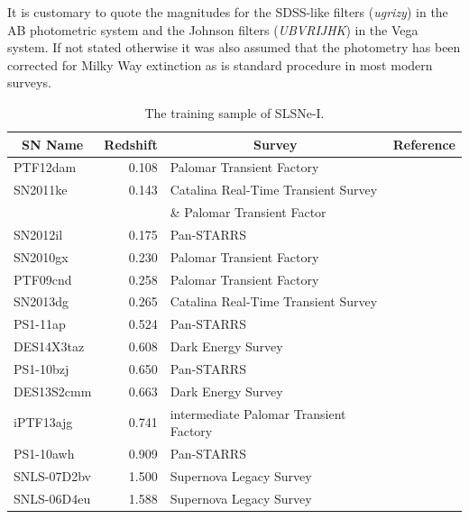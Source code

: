 It is customary to quote the magnitudes for the SDSS-like filters (\textit{ugrizy}) in the AB photometric system and the Johnson filters (\textit{UBVRIJHK}) in the Vega system. If not stated otherwise it was also assumed that the photometry has been corrected for Milky Way extinction as is standard procedure in most modern surveys.

\begin{table}
\begin{center}
  \caption{The training sample of SLSNe-I.}
\label{tab:PubishedSLSNe}
\begin{tabular}{|l|r|l|l|}
\hline
  \multicolumn{1}{|c|}{SN Name} &
  \multicolumn{1}{c|}{Redshift} &
  \multicolumn{1}{c|}{Survey} &
  \multicolumn{1}{c|}{Reference} \\
\hline
  PTF12dam         & 0.108 & Palomar Transient Factory             & \citet{Nicholl2013}\\
  SN2011ke         & 0.143 & Catalina Real-Time Transient Survey     & \citet{Inserra2013}\\
                      &       & \& Palomar Transient Factor & \\
  SN2012il         & 0.175 & Pan-STARRS                             & \citet{Lunnan2013}\\
  SN2010gx         & 0.230 & Palomar Transient Factory             & \citet{Pastorello2010}\\
  PTF09cnd         & 0.258 & Palomar Transient Factory             & \citet{Quimby2011}\\
  SN2013dg         & 0.265 & Catalina Real-Time Transient Survey     & \citet{Nicholl2014} \\
  PS1-11ap         & 0.524 & Pan-STARRS                             & \citet{McCrum2014a}\\
  DES14X3taz     & 0.608 & Dark Energy Survey                     & \citet{Smith2016} \\
  PS1-10bzj     & 0.650 & Pan-STARRS                             & \citet{Lunnan2013}\\
  DES13S2cmm     & 0.663 & Dark Energy Survey                     & \citet{Papadopoulos2015} \\
  iPTF13ajg     & 0.741 & intermediate Palomar Transient Factory&\citet{Vreeswijk2014}\\
  PS1-10awh     & 0.909 & Pan-STARRS                             & \citet{Chomiuk2011}\\
  SNLS-07D2bv & 1.500 & Supernova Legacy Survey                 &\citet{Howell2013}\\
  SNLS-06D4eu & 1.588 & Supernova Legacy Survey                 &\citet{Howell2013}\\
\hline\end{tabular}
\end{center}
\end{table}
